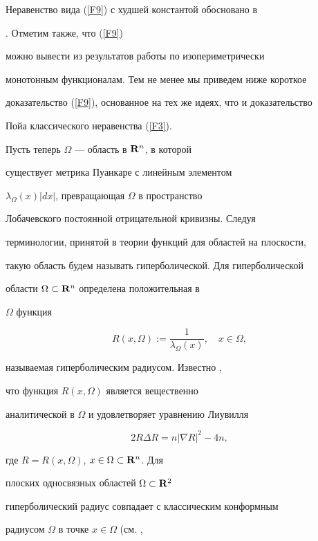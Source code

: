 Неравенство вида (\ref{F9}) с худшей константой обосновано в 


\cite{l11}. Отметим также, что (\ref {F9})


можно вывести из результатов работы \cite{l12} по изопериметрически 


монотонным функционалам. Тем не менее мы приведем ниже короткое 


доказательство (\ref{F9}), основанное на тех же идеях, что и доказательство


Пойа классического неравенства (\ref{F3}).





Пусть теперь $\Omega$ --- область в ${\bold R}^n$, в которой


существует метрика Пуанкаре с линейным элементом


$\lambda_\Omega(x)|dx|$, превращающая $\Omega$ в пространство


Лобачевского постоянной отрицательной кривизны. Следуя


терминологии, принятой в теории функций для областей на плоскости,


такую область будем называть гиперболической. Для гиперболической


области $\Omega\subset {\bold R}^n$ определена положительная в


$\Omega$ функция


$$


R(x,\Omega):=\frac{1}{\lambda_\Omega(x)},\quad x\in\Omega,


$$


называемая гиперболическим радиусом. Известно \cite{l13}, 


что функция $R(x,\Omega)$ является вещественно


аналитической в $\Omega$ и удовлетворяет уравнению Лиувилля


\begin{equation} \label{F10}


2R\Delta R=n|\nabla R|^2-4n,


\end{equation}


где $R=R(x,\Omega)$, $x\in \Omega\subset{\bold R}^n$. Для


плоских односвязных областей $\Omega\subset{\bold R}^2$


гиперболический радиус совпадает с классическим конформным


радиусом $\Omega$ в точке $x\in\Omega$ (см. \cite{l8},


